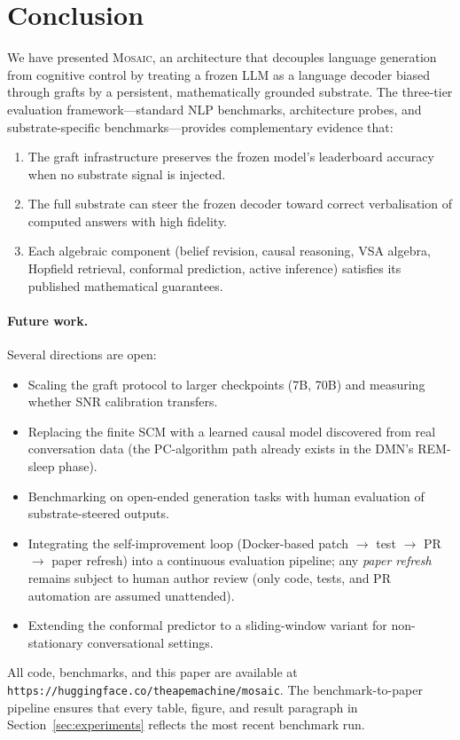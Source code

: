 
\section{Conclusion}
\label{sec:conclusion}

We have presented \textsc{Mosaic}, an architecture that decouples language
generation from cognitive control by treating a frozen LLM as a language decoder
biased through grafts by a persistent, mathematically grounded substrate.  The
three-tier evaluation framework---standard NLP benchmarks, architecture probes,
and substrate-specific benchmarks---provides complementary evidence that:

\begin{enumerate}[nosep]
  \item The graft infrastructure preserves the frozen model's leaderboard
    accuracy when no substrate signal is injected.
  \item The full substrate can steer the frozen decoder toward correct
    verbalisation of computed answers with high fidelity.
  \item Each algebraic component (belief revision, causal reasoning, VSA
    algebra, Hopfield retrieval, conformal prediction, active inference)
    satisfies its published mathematical guarantees.
\end{enumerate}

\paragraph{Future work.}
Several directions are open:
\begin{itemize}[nosep]
  \item Scaling the graft protocol to larger checkpoints (7B, 70B) and
    measuring whether SNR calibration transfers.
  \item Replacing the finite SCM with a learned causal model discovered from
    real conversation data (the PC-algorithm path already exists in the DMN's
    REM-sleep phase).
  \item Benchmarking on open-ended generation tasks with human evaluation of
    substrate-steered outputs.
  \item Integrating the self-improvement loop (Docker-based patch $\to$ test
    $\to$ PR $\to$ paper refresh) into a continuous evaluation pipeline; any
    \emph{paper refresh} remains subject to human author review (only code,
    tests, and PR automation are assumed unattended).
  \item Extending the conformal predictor to a sliding-window variant for
    non-stationary conversational settings.
\end{itemize}

All code, benchmarks, and this paper are available at
\texttt{https://huggingface.co/theapemachine/mosaic}.  The benchmark-to-paper
pipeline ensures that every table, figure, and result paragraph in
Section~\ref{sec:experiments} reflects the most recent benchmark run.
